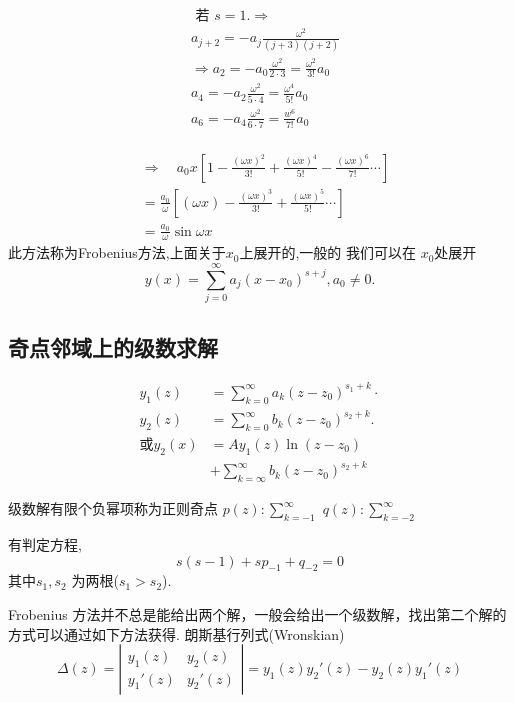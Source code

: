 $$
\begin{aligned}
& \text { 若 } s=1 . \Rightarrow \\
& a_{j+2}=-a_j \frac{\omega^2}{(j+3) (j+2)} \\
& \Rightarrow a_2=-a_0 \frac{\omega^2}{2 \cdot 3}=\frac{\omega^2}{3 !} a_0 \\
& a_4=-a_2 \frac{\omega^2}{5 \cdot 4}=\frac{\omega^4}{5 !} a_0 \\
& a_6=-a_4 \frac{\omega^2}{6\cdot 7}=\frac{w^6}{7 !} a_0 \\
\end{aligned}
$$

$$
\begin{aligned}
& \Rightarrow \quad a_0 x\left[1-\frac{(\omega x)^2}{3 !}+\frac{(\omega x)^{4}}{5 !}-\frac{(\omega x)^6}{7 !} \cdots\right] \\
& =\frac{a_0}{\omega}\left[(\omega x)-\frac{(\omega x)^3}{3 !}+\frac{(\omega x)^5}{5 !} \cdots\right] \\
& =\frac{a_0}{\omega} \sin \omega x
\end{aligned}
$$
此方法称为Frobenius方法,上面关于$x_0$上展开的,一般的
我们可以在 $x_0$处展开
$$
y(x)=\sum_{j=0}^{\infty} a_j\left(x-x_0\right)^{s+j}, a_0 \neq 0 .
$$


\subsection{奇点邻域上的级数求解}
$$
\begin{aligned}
y_1(z) & =\sum_{k=0}^{\infty} a_k\left(z-z_0\right)^{s_1+k} \cdot \\
y_2(z) & =\sum_{k=0}^{\infty} b_k\left(z-z_0\right)^{s_2+k} . \\
\text{或} y_2(x) & =A y_1(z) \ln \left(z-z_0\right) \\
& +\sum_{k=\infty}^{\infty} b_k\left(z-z_0\right)^{s_2+k}
\end{aligned}
$$


级数解有限个负幂项称为正则奇点 $p(z): \sum_{k=-1}^{\infty}$
$q(z) : \sum_{k=-2}^{\infty}$

有判定方程,
$$
s(s-1)+s p_{-1}+q_{-2}=0
$$
其中$s_1, s_2$ 为两根($s_1> s_2$).

Frobenius 方法并不总是能给出两个解，一般会给出一个级数解，找出第二个解的方式可以通过如下方法获得.
朗斯基行列式(Wronskian)
$$
\Delta(z)=\left|\begin{array}{ll}
y_1(z) & y_2(z) \\
y_1'(z) & y_2'(z)
\end{array}\right|= y_1(z) y_2'(z) - y_2(z) y_1'(z)
$$

